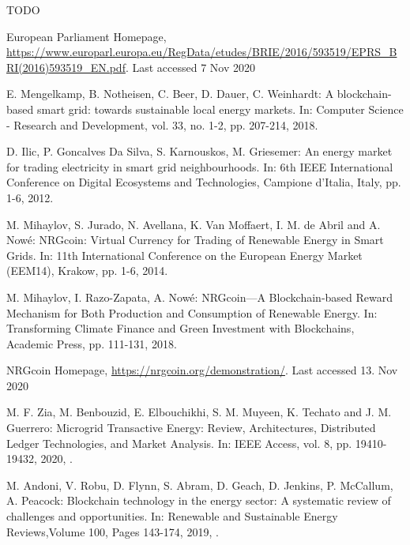 \documentclass[runningheads]{llncs}
\begin{document}
TODO

%
%
%
% 
% 
%
\begin{thebibliography}{8}
European Parliament Homepage, \url{https://www.europarl.europa.eu/RegData/etudes/BRIE/2016/593519/EPRS\_BRI(2016)593519\_EN.pdf}. Last accessed 7 Nov 2020

E. Mengelkamp, B. Notheisen, C. Beer, D. Dauer, C. Weinhardt: A blockchain-based smart grid: towards sustainable local energy markets. In:  Computer Science - Research and Development, vol. 33, no. 1-2, pp. 207-214, 2018. 

D. Ilic, P. Goncalves Da Silva, S. Karnouskos, M. Griesemer: An energy market for trading electricity in smart grid neighbourhoods. In: 6th IEEE International Conference on Digital Ecosystems and Technologies, Campione d'Italia, Italy, pp. 1-6, 2012. 

M. Mihaylov, S. Jurado, N. Avellana, K. Van Moffaert, I. M. de Abril and A. Nowé: NRGcoin: Virtual Currency for Trading of Renewable Energy in Smart Grids. In: 11th International Conference on the European Energy Market (EEM14), Krakow, pp. 1-6, 2014. 

M. Mihaylov, I. Razo-Zapata, A. Nowé: NRGcoin—A Blockchain-based Reward Mechanism for Both Production and Consumption of Renewable Energy. In: Transforming Climate Finance and Green Investment with Blockchains, Academic Press, pp. 111-131, 2018.

NRGcoin Homepage, \url{https://nrgcoin.org/demonstration/}. Last accessed 13. Nov 2020

M. F. Zia, M. Benbouzid, E. Elbouchikhi, S. M. Muyeen, K. Techato and J. M. Guerrero:  Microgrid Transactive Energy: Review, Architectures, Distributed Ledger Technologies, and Market Analysis. In: IEEE Access, vol. 8, pp. 19410-19432, 2020, .

M. Andoni, V. Robu, D. Flynn, S. Abram, D. Geach, D. Jenkins, P. McCallum, A. Peacock:
Blockchain technology in the energy sector: A systematic review of challenges and opportunities. In: Renewable and Sustainable Energy Reviews,Volume 100, Pages 143-174, 2019, .


\end{thebibliography}
\end{document}
